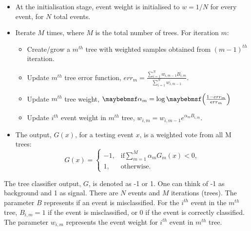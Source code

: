\begin{itemize}
  \item At the initialisation stage,  event weight is initialised to $w = 1 / N$ for every event, for $N$ total events.
  \item Iterate $M$ times, where $M$ is the total number of trees. For iteration $m$:
    \begin{itemize}
      \item Create/grow a $m^{th}$ tree  with weighted samples obtained from $(m-1)^{th}$ iteration.
      \item Update $m^{th}$ tree error function, $err_m = \frac{\sum_{i = 1}^{N} w_{i,m-1} B_{i,m} }{\sum_{i = 1}^{N}w_{i,m-1}}$.
      \item Update $m^{th}$ tree weight,  $\alpha_m = \log\parenths{\frac{1 - err_m}{err_m}}$
      \item Update $i^{th}$ event weight in $m^{th}$ tree, $w_{i,m} = w_{i,m-1} e^{\alpha_m B_{i,m} }$.
    \end{itemize}
  \item The output, $G(x)$, for a testing event $x$, is a weighted vote from all M trees:
  \begin{equation}
    G(x)=
     \begin{cases}
      -1, & \mbox{if} \sum_{m=1}^{M}\alpha_mG_m(x) < 0 , \\
      1, & \mbox{otherwise}.
    \end{cases}
  \end{equation}
\end{itemize}
The tree classifier output, $G$, is denoted as  -1 or 1. One can think of -1 as background and 1 as signal. There are $N$ events and $M$ iterations (trees). The parameter $B$ represents if an event is misclassified. For the $i^{th}$ event in the  $m^{th}$ tree,  $B_{i,m} = 1$ if the event is misclassified, or 0 if the event is correctly classified. The parameter $w_{i,m}$ represents the event weight for $i^{th}$ event  in $m^{th}$ tree.


